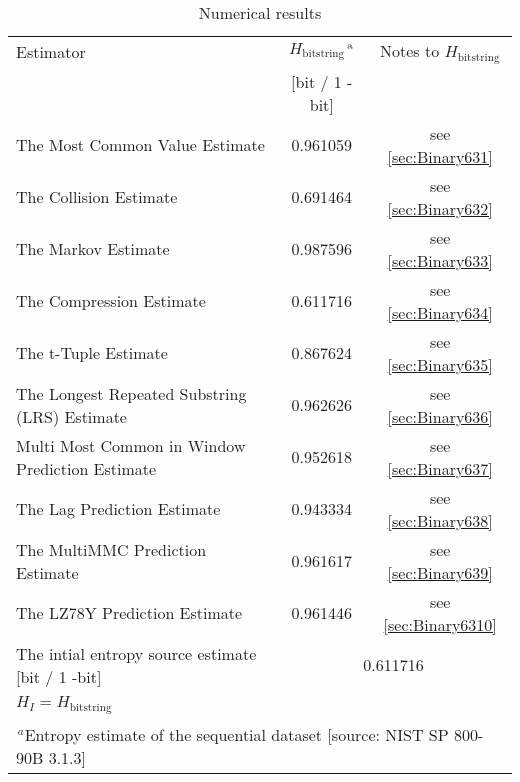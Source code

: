\documentclass[a3paper,xelatex,english]{bxjsarticle}
\begin{document}
\begin{table}[h]
\caption{Numerical results}
\begin{center}
\begin{tabular}{|l|c|c|}
\hline 
\rowcolor{anotherlightblue} %
Estimator										& $H_{\textrm{bitstring}}$$^{\textrm{\,a}}$ & Notes to $H_{\textrm{bitstring}}$	\\ 
\cline{2-3}
\rowcolor{anotherlightblue} %
\,												& [bit / 1 - bit]		\\
\hline 
The Most Common Value Estimate					& 0.961059& see \ref{sec:Binary631} \\
\hline 
The Collision Estimate							& 0.691464& see \ref{sec:Binary632} \\
\hline 
The Markov Estimate								& 0.987596& see \ref{sec:Binary633} \\
\hline 
The Compression Estimate						& 0.611716& see \ref{sec:Binary634} \\
\hline 
The t-Tuple Estimate							& 0.867624& see \ref{sec:Binary635} \\
\hline 
The Longest Repeated Substring (LRS) Estimate	& 0.962626& see \ref{sec:Binary636} \\
\hline 
Multi Most Common in Window Prediction Estimate	& 0.952618& see \ref{sec:Binary637} \\
\hline 
The Lag Prediction Estimate						& 0.943334& see \ref{sec:Binary638} \\
\hline 
The MultiMMC Prediction Estimate				& 0.961617& see \ref{sec:Binary639} \\
\hline 
The LZ78Y Prediction Estimate					& 0.961446& see \ref{sec:Binary6310} \\
\hline \hline 
The intial entropy source estimate [bit / 1 -bit]	& \multicolumn{2}{|c|}{0.611716}	\\
$H_{I} = H_{\textrm{bitstring}}$ & \multicolumn{2}{|c|}{ \, } 	\\
\hline \hline 
\multicolumn{3}{|l|}{$^{\,a}$\quad Entropy estimate of the sequential dataset [source: NIST SP 800-90B \cite{SP80090B} 3.1.3]} \\
\hline 
\end{tabular}
\end{center}
\end{table}
\end{document}
